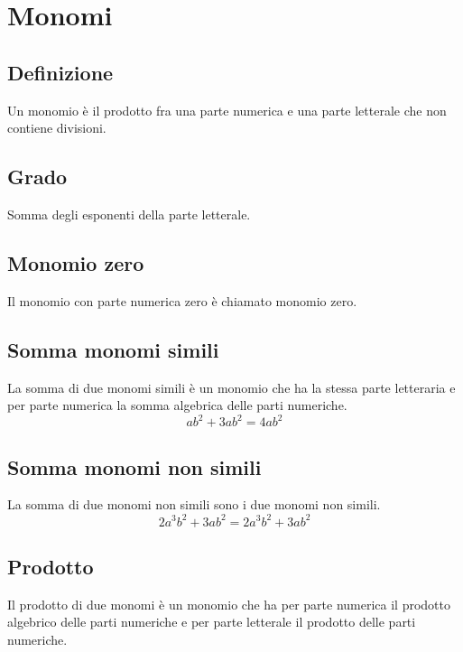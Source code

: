 \chapter{Monomi}
\section{Definizione}
Un monomio è il prodotto fra una parte numerica e una parte letterale che non contiene divisioni.
\section{Grado} 
Somma degli esponenti della parte letterale.
\section{Monomio zero}
Il monomio con parte numerica zero è chiamato monomio zero.
\section{Somma monomi simili}
La somma di due monomi simili è un monomio che ha la stessa parte letteraria e per parte numerica la somma algebrica delle parti numeriche.
\begin{equation}
ab^2+3ab^2=4ab^2
\end{equation}
\section{Somma monomi non simili}
La somma di due monomi non simili  sono i due monomi non simili.
\begin{equation}
2a^3b^2+3ab^2=2a^3b^2+3ab^2
\end{equation}
\section{Prodotto}
Il prodotto di due monomi è un monomio che ha per parte numerica il prodotto algebrico delle parti numeriche e per parte letterale il prodotto delle parti numeriche.